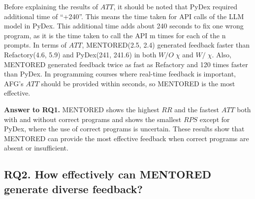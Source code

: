 \documentclass[10pt,conference]{IEEEtran}
\begin{document}
        Before explaining the results of $ATT$, it should be noted that PyDex required additional time of ``+240''. This means the time taken for API calls of the LLM model in PyDex. This additional time adds about 240 seconds to fix one wrong program, as it is the time taken to call the API m times for each of the n prompts. In terms of $ATT$, MENTORED(2.5, 2.4) generated feedback faster than Refactory(4.6, 5.9) and PyDex(241, 241.6) in both $W/O\;\chi$ and $W/\;\chi$. Also, MENTORED generated feedback twice as fast as Refactory and 120 times faster than PyDex. In programming courses where real-time feedback is important, AFG's $ATT$ should be provided within seconds, so MENTORED is the most effective.

        \begin{tcolorbox}
            \textbf{Answer to RQ1.}
            MENTORED shows the highest $RR$ and the fastest $ATT$ both with and without correct programs and shows the smallest $RPS$ except for PyDex, where the use of correct programs is uncertain. These results show that MENTORED can provide the most effective feedback when correct programs are absent or insufficient.
        \end{tcolorbox}



    \subsection{RQ2. How effectively can MENTORED generate diverse feedback?}
\end{document}
